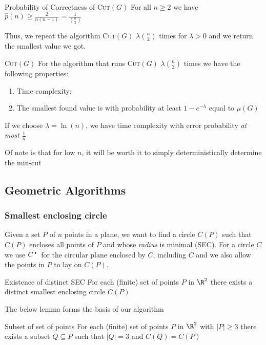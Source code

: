 \begin{lemma}[]{Probability of Correctness of \textsc{Cut}$(G)$}
    For all $n \geq 2$ we have $\displaystyle \hat{p}(n) \geq \frac{2}{n(n - 1)} = \frac{1}{{n \choose 2}}$
\end{lemma}
Thus, we repeat the algorithm \textsc{Cut}$(G)$ $\lambda {n \choose 2}$ times for $\lambda > 0$ and we return the smallest value we got.
\begin{theorem}[]{\textsc{Cut}$(G)$}
    For the algorithm that runs \textsc{Cut}$(G)$ $\lambda{n \choose 2}$ times we have the following properties:
    \begin{enumerate}[label=(\arabic*)]
        \item Time complexity: 
        \item The smallest found value is with probability at least $1 - e^{-\lambda}$ equal to $\mu(G)$
    \end{enumerate}
\end{theorem}
If we choose $\lambda = \ln(n)$, we have time complexity  with error probability \textit{at most} $\frac{1}{n}$

Of note is that for low $n$, it will be worth it to simply deterministically determine the min-cut


\newpage
\subsection{Geometric Algorithms}

\subsubsection{Smallest enclosing circle}
\newcommand{\cplane}{C^\text{\textbullet}}
Given a set $P$ of $n$ points in a plane, we want to find a circle $C(P)$ such that $C(P)$ encloses all points of $P$ and whose \textit{radius} is minimal (SEC).
For a circle $C$ we use $\cplane$ for the circular plane enclosed by $C$, including $C$ and we also allow the points in $P$ to lay on $C(P)$.
\begin{lemma}[]{Existence of distinct SEC}
    For each (finite) set of points $P$ in $\R^2$ there exists a distinct smallest enclosing circle $C(P)$
\end{lemma}

The below lemma forms the basis of our algorithm
\begin{lemma}[]{Subset of set of points}
    For each (finite) set of points $P$ in $\R^2$ with $|P| \geq 3$ there exists a subset $Q \subseteq P$ such that $|Q| = 3$ and $C(Q) = C(P)$
\end{lemma}

